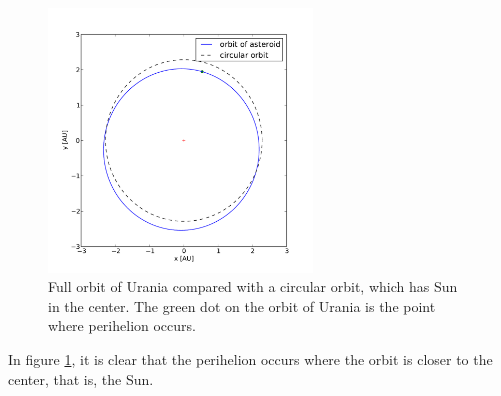 \documentclass[a4paper,12pt]{article}
\begin{document}
\begin{figure}[H]
\centering
	\includegraphics [angle=0,height=7cm,width=7cm]{pic/urania_orbit.pdf} 
\caption{Full orbit of Urania compared with a circular orbit, which has Sun in the center. The green dot on the orbit of Urania is the point where perihelion occurs.}
\label{fig:orbit}
\end{figure}
In figure \ref{fig:orbit}, it is clear that the perihelion occurs where the orbit is closer to the center, that is, the Sun. 
\end{document}
